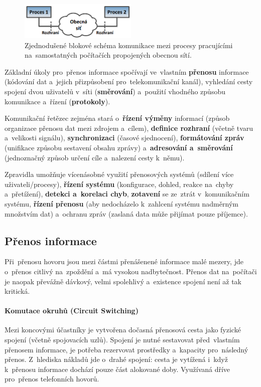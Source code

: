 \begin{figure}[ht]
	\centering
	\includegraphics[width=0.5\textwidth]{images/q01_simplified_scheme_processes}
	\caption{Zjednodušené blokové schéma komunikace mezi procesy pracujícími na~samostatných počítačích propojených obecnou sítí.}
	\label{q01_simplified_scheme_processes}
\end{figure}

Základní úkoly pro~přenos informace spočívají ve~vlastním \textbf{přenosu} informace (kódování dat a~jejich přizpůsobení pro~telekomunikační kanál), vyhledání cesty spojení dvou uživatelů v~síti (\textbf{směrování}) a~použití vhodného způsobu komunikace a~řízení (\textbf{protokoly}).

Komunikační řetězec zejména stará o~\textbf{řízení výměny} informací (způsob organizace přenosu dat mezi zdrojem a~cílem), \textbf{definice rozhraní} (včetně tvaru a~velikosti signálu), \textbf{synchronizaci} (časové sjednocení), \textbf{formátování zpráv} (unifikace způsobu sestavení obsahu zprávy) a~\textbf{adresování a~směrování} (jednoznačný způsob určení cíle a~nalezení cesty k~němu).

Zpravidla umožňuje vícenásobné využití přenosových systémů (sdílení více uživateli/procesy), \textbf{řízení systému} (konfigurace, dohled, reakce na~chyby a~přetížení), \textbf{detekci a~korelaci chyb}, \textbf{zotavení} se ze~ztrát v~komunikačním systému, \textbf{řízení přenosu} (aby nedocházelo k~zahlcení systému nadměrným množstvím dat) a~ochranu zpráv (zaslaná data může přijímat pouze příjemce).

\subsection{Přenos informace}

Při~přenosu hovoru jsou mezi částmi přenášenené informace malé mezery, jde o~přenos citlivý na~zpoždění a~má vysokou nadbytečnost. Přenos dat na~počítači je naopak převážně dávkový, velmi spolehlivý a~existence spojení není až tak kritická.

\paragraph{Komutace okruhů (Circuit Switching)} Mezi koncovými účastníky je vytvořena dočasná přenosová cesta jako fyzické spojení (včetně spojovacích uzlů). Spojení je nutné sestavovat před~vlastním přenosem informace, je potřeba rezervovat prostředky a~kapacity pro~následný přenos. Z~hlediska nákladů jde o~drahé spojení: cesta je vytížená i~když k~přenosu informace dochází pouze část alokované doby. Využívaná dříve pro~přenos telefonních hovorů.

